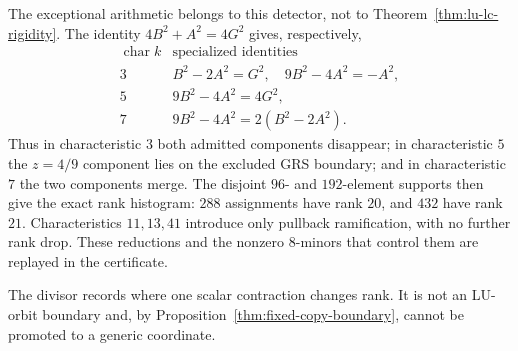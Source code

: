 The exceptional arithmetic belongs to this detector, not to
Theorem~\ref{thm:lu-lc-rigidity}.  The identity
\(4B^2+A^2=4G^2\) gives, respectively,
\[
\begin{array}{c|c}
\operatorname{char}k&\text{specialized identities}\\ \hline
3&B^2-2A^2=G^2,\quad 9B^2-4A^2=-A^2,\\
5&9B^2-4A^2=4G^2,\\
7&9B^2-4A^2=2(B^2-2A^2).
\end{array}
\]
Thus in characteristic \(3\) both admitted components disappear; in
characteristic \(5\) the \(z=4/9\) component lies on the excluded GRS
boundary; and in characteristic \(7\) the two components merge.  The
disjoint \(96\)- and \(192\)-element supports then give the exact rank
histogram: \(288\) assignments have rank \(20\), and \(432\) have rank
\(21\).
Characteristics \(11,13,41\) introduce only pullback ramification, with
no further rank drop.  These reductions and the nonzero \(8\)-minors
that control them are replayed in the certificate.

The divisor records where one scalar contraction changes rank.  It is
not an LU-orbit boundary and, by
Proposition~\ref{thm:fixed-copy-boundary}, cannot be promoted to a
generic coordinate.
